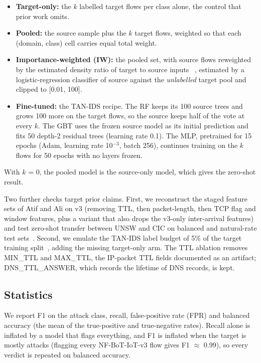 \documentclass[11pt]{article}
\begin{document}
\begin{itemize}
\item \textbf{Target-only:} the $k$ labelled target flows per class alone, the control that prior work omits.
\item \textbf{Pooled:} the source sample plus the $k$ target flows, weighted so that each (domain, class) cell carries equal total weight.
\item \textbf{Importance-weighted (IW):} the pooled set, with source flows reweighted by the estimated density ratio of target to source inputs ~\cite{shimodaira2000improving,sugiyama2007covariate}, estimated by a logistic-regression classifier of source against the \emph{unlabelled} target pool and clipped to [0.01, 100].
\item \textbf{Fine-tuned:} the TAN-IDS recipe. The RF keeps its 100 source trees and grows 100 more on the target flows, so the source keeps half of the vote at every $k$. The GBT uses the frozen source model as its initial prediction and fits 50 depth-2 residual trees (learning rate 0.1). The MLP, pretrained for 15 epochs (Adam, learning rate 10$^{-3}$, batch 256), continues training on the $k$ flows for 50 epochs with no layers frozen.
\end{itemize}

With $k$ = 0, the pooled model is the source-only model, which gives the zero-shot result.

Two further checks target prior claims. First, we reconstruct the staged feature sets of Atif and Ali on v3 (removing TTL, then packet-length, then TCP flag and window features, plus a variant that also drops the v3-only inter-arrival features) and test zero-shot transfer between UNSW and CIC on balanced and natural-rate test sets~\cite{atif2026threeaxis}. Second, we emulate the TAN-IDS label budget of 5\% of the target training split~\cite{hathanh2026tanids}, adding the missing target-only arm. The TTL ablation removes MIN\_TTL and MAX\_TTL, the IP-packet TTL fields documented as an artifact; DNS\_TTL\_ANSWER, which records the lifetime of DNS records, is kept.

\subsection{Statistics}

We report F1 on the attack class, recall, false-positive rate (FPR) and balanced accuracy (the mean of the true-positive and true-negative rates). Recall alone is inflated by a model that flags everything, and F1 is inflated when the target is mostly attacks (flagging every NF-BoT-IoT-v3 flow gives F1 $\approx$ 0.99), so every verdict is repeated on balanced accuracy.
\end{document}
